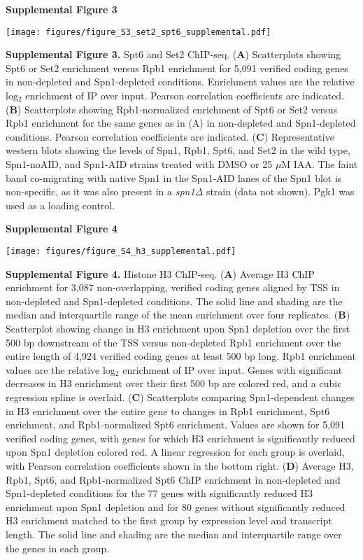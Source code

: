 \documentclass[8pt]{extarticle}
\begin{document}
\newpage

\textbf{\large Supplemental Figure 3}

{\texttt{[image: figures/figure\_S3\_set2\_spt6\_supplemental.pdf]}\par}

\vspace{2em}
\textbf{Supplemental Figure 3.} Spt6 and Set2 ChIP-seq.
(\textbf{A}) Scatterplots showing Spt6 or Set2 enrichment versus Rpb1 enrichment for 5,091 verified coding genes in non-depleted and Spn1-depleted conditions.
Enrichment values are the relative log$_2$ enrichment of IP over input.
Pearson correlation coefficients are indicated.
(\textbf{B}) Scatterplots showing Rpb1-normalized enrichment of Spt6 or Set2 versus Rpb1 enrichment for the same genes as in (A) in non-depleted and Spn1-depleted conditions.
Pearson correlation coefficients are indicated.
(\textbf{C}) Representative western blots showing the levels of Spn1, Rpb1, Spt6, and Set2 in the wild type, Spn1-noAID, and Spn1-AID strains treated with DMSO or 25 $\mu$M IAA.
The faint band co-migrating with native Spn1 in the Spn1-AID lanes of the Spn1 blot is non-specific, as it was also present in a \textit{spn1$\Delta$} strain (data not shown).
Pgk1 was used as a loading control.

\newpage

\textbf{\large Supplemental Figure 4}

{\texttt{[image: figures/figure\_S4\_h3\_supplemental.pdf]}\par}

\vspace{2em}
\textbf{Supplemental Figure 4.} Histone H3 ChIP-seq.
(\textbf{A}) Average H3 ChIP enrichment for 3,087 non-overlapping, verified coding genes aligned by TSS in non-depleted and Spn1-depleted conditions.
The solid line and shading are the median and interquartile range of the mean enrichment over four replicates.
(\textbf{B}) Scatterplot showing change in H3 enrichment upon Spn1 depletion over the first 500 bp downstream of the TSS versus non-depleted Rpb1 enrichment over the entire length of 4,924 verified coding genes at least 500 bp long.
Rpb1 enrichment values are the relative log$_2$ enrichment of IP over input.
Genes with significant decreases in H3 enrichment over their first 500 bp are colored red, and a cubic regression spline is overlaid.
(\textbf{C}) Scatterplots comparing Spn1-dependent changes in H3 enrichment over the entire gene to changes in Rpb1 enrichment, Spt6 enrichment, and Rpb1-normalized Spt6 enrichment.
Values are shown for 5,091 verified coding genes, with genes for which H3 enrichment is significantly reduced upon Spn1 depletion colored red.
A linear regression for each group is overlaid, with Pearson correlation coefficients shown in the bottom right.
(\textbf{D}) Average H3, Rpb1, Spt6, and Rpb1-normalized Spt6 ChIP enrichment in non-depleted and Spn1-depleted conditions for the 77 genes with significantly reduced H3 enrichment upon Spn1 depletion and for 80 genes without significantly reduced H3 enrichment matched to the first group by expression level and transcript length.
The solid line and shading are the median and interquartile range over the genes in each group.
\end{document}
